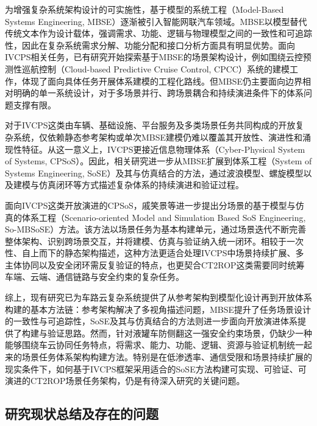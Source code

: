     为增强复杂系统架构设计的可实施性，基于模型的系统工程（Model-Based Systems Engineering, MBSE）逐渐被引入智能网联汽车领域。MBSE以模型替代传统文本作为设计载体，强调需求、功能、逻辑与物理模型之间的一致性和可追踪性，因此在复杂系统需求分解、功能分配和接口分析方面具有明显优势。面向IVCPS相关任务，已有研究开始探索基于MBSE的场景架构设计，例如围绕云控预测性巡航控制（Cloud-based Predictive Cruise Control, CPCC）系统的建模工作，体现了面向具体任务开展体系建模的工程化路线\cite{xu2023mbseivcps}。但MBSE仍主要面向边界相对明确的单一系统设计，对于多场景并行、跨场景耦合和持续演进条件下的体系问题支撑有限。

    对于IVCPS这类由车辆、基础设施、平台服务及多类场景任务共同构成的开放复杂系统，仅依赖静态参考架构或单次MBSE建模仍难以覆盖其开放性、演进性和涌现性特征。从这一意义上，IVCPS更接近信息物理体系（Cyber-Physical System of Systems, CPSoS）。因此，相关研究进一步从MBSE扩展到体系工程（System of Systems Engineering, SoSE）及其与仿真结合的方法，通过波浪模型、螺旋模型以及建模与仿真闭环等方式描述复杂体系的持续演进和验证过程\cite{wangweiping2019mbse,fengyimin2024soseframework,liminghua2021aerospace,zhanglin2022sosembs,liuxinghua2011sysmlsimulink,liutonglei2015tripleredundant,zhangshaojie2018mbsecivilaircraft,weicaise2021airsensor,guoyuliang2023door,qinchangmao2021remoteexpert,liuyang2024soseoutlook}。

    面向IVCPS这类开放演进的CPSoS，戚笑景等\cite{qixiaojing2026mbsose}进一步提出分场景的基于模型与仿真的体系工程（Scenario-oriented Model and Simulation Based SoS Engineering, So-MBSoSE）方法。该方法以场景任务为基本构建单元，通过场景迭代不断完善整体架构、识别跨场景交互，并将建模、仿真与验证纳入统一闭环。相较于一次性、自上而下的静态架构描述，这种方法更适合处理IVCPS中场景持续扩展、多主体协同以及安全闭环需反复验证的特点，也更契合CT2ROP这类需要同时统筹车端、云端、通信链路与安全约束的复杂任务。

    综上，现有研究已为车路云复杂系统提供了从参考架构到模型化设计再到开放体系构建的基本方法链：参考架构解决了多视角描述问题，MBSE提升了任务场景设计的一致性与可追踪性，SoSE及其与仿真结合的方法则进一步面向开放演进体系提供了构建与验证思路。然而，针对液罐车防侧翻这一强安全约束场景，仍缺少一种能够围绕车云协同任务特点，将需求、能力、功能、逻辑、资源与验证机制统一起来的场景任务体系架构构建方法。特别是在低渗透率、通信受限和场景持续扩展的现实条件下，如何基于IVCPS框架采用适合的SoSE方法构建可实现、可验证、可演进的CT2ROP场景任务架构，仍是有待深入研究的关键问题。

  \subsection{研究现状总结及存在的问题}

